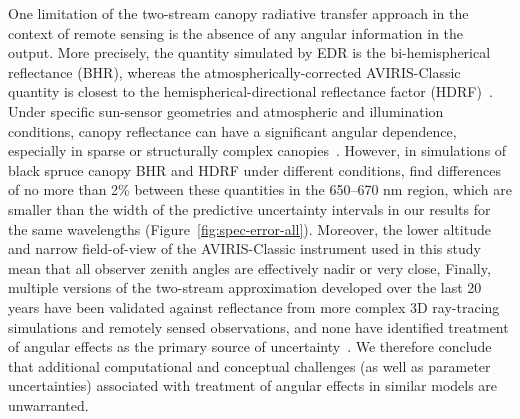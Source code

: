 One limitation of the two-stream canopy radiative transfer approach in the context of remote sensing is the absence of any angular information in the output.
More precisely, the quantity simulated by EDR is the bi-hemispherical reflectance (BHR), whereas the atmospherically-corrected AVIRIS-Classic quantity is closest to the hemispherical-directional reflectance factor (HDRF)~\citep[\emph{sensu}]{schaepman-strub2006reflectance}.
Under specific sun-sensor geometries and atmospheric and illumination conditions, canopy reflectance can have a significant angular dependence, especially in sparse or structurally complex canopies~\citep[e.g., ``hot spot effect'']{maignan2004bidirectional, schaepman-strub2006reflectance}.
However, in simulations of black spruce canopy BHR and HDRF under different conditions, \citet{schaepman-strub2006reflectance} find differences of no more than 2\% between these quantities in the 650--670 \unit{nm} region, which are smaller than the width of the predictive uncertainty intervals in our results for the same wavelengths (Figure~\ref{fig:spec-error-all}).
Moreover, the lower altitude and narrow field-of-view of the AVIRIS-Classic instrument used in this study mean that all observer zenith angles are effectively nadir or very close,
Finally, multiple versions of the two-stream approximation developed over the last 20 years have been validated against reflectance from more complex 3D ray-tracing simulations and remotely sensed observations, and none have identified treatment of angular effects as the primary source of uncertainty~\citep{hogan_2018_fast, yuan2017reexamination, pinty2004synergy}.
We therefore conclude that additional computational and conceptual challenges (as well as parameter uncertainties) associated with treatment of angular effects in similar models are unwarranted.

